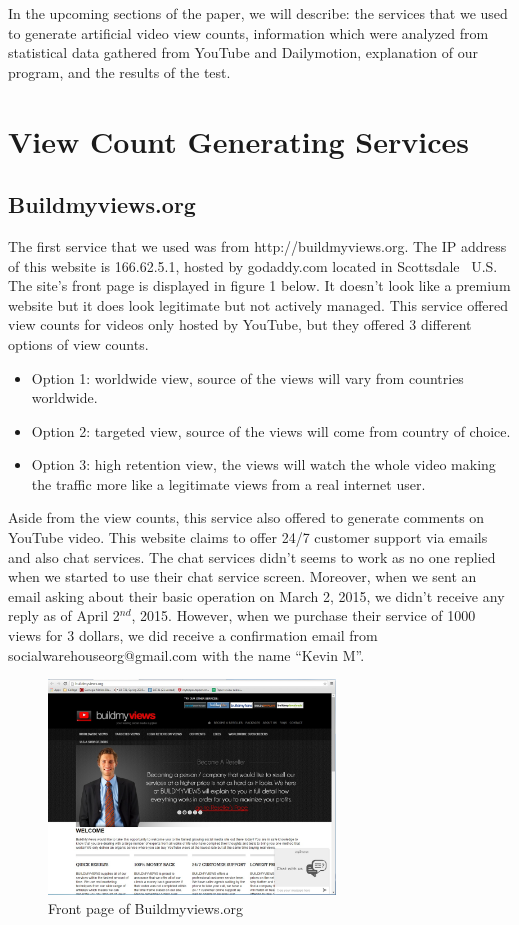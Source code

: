 \documentclass[conference]{IEEEtran}
\begin{document}
In the upcoming sections of the paper, we will describe: the services that we used to generate artificial video view counts, information which were analyzed from statistical data gathered from YouTube and Dailymotion, explanation of our program, and the results of the test.

\section{View Count Generating Services}

\subsection{Buildmyviews.org}
The first service that we used was from http://buildmyviews.org. The IP address of this website is 166.62.5.1, hosted by godaddy.com located in Scottsdale~\cite{c6} U.S. The site’s front page is displayed in figure 1 below. It doesn’t look like a premium website but it does look legitimate but not actively managed. This service offered view counts for videos only hosted by YouTube, but they offered 3 different options of view counts.

\begin{itemize}
  \item Option 1: worldwide view, source of the views will vary from countries worldwide.
  \item Option 2: targeted view, source of the views will come from country of choice.
  \item Option 3: high retention view, the views will watch the whole video making the traffic more like a legitimate views from a real internet user.
\end{itemize}

Aside from the view counts, this service also offered to generate comments on YouTube video. This website claims to offer 24/7 customer support via emails and also chat services. The chat services didn’t seems to work as no one replied when we started to use their chat service screen. Moreover, when we sent an email asking about their basic operation on March 2, 2015, we didn’t receive any reply as of April 2$^{nd}$, 2015. However, when we purchase their service of 1000 views for 3 dollars, we did receive a confirmation email from socialwarehouseorg@gmail.com with the name ``Kevin M''.

\begin{figure}
  \centering
  \includegraphics[width=3.0in]{fig1}
  \caption{Front page of Buildmyviews.org}
\end{figure}
\end{document}
